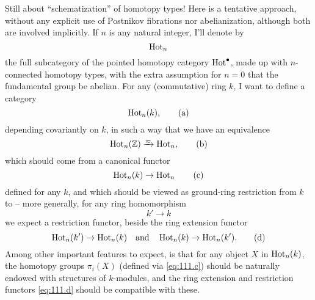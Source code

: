 \label{sec:111}%
Still about ``schematization'' of homotopy types! Here is a tentative
approach, without any explicit use of Postnikov fibrations nor
abelianization, although both are involved implicitly. If $n$ is any
natural integer, I'll denote by
\[\operatorname{Hot}_n\]
the full subcategory of the pointed homotopy category
$\operatorname{Hot}^\bullet$, made up with $n$-connected homotopy types, with the
extra assumption for $n=0$ that the fundamental group be abelian. For
any (commutative) ring $k$, I want to define a category
\begin{equation}
  \label{eq:111.a}
  \operatorname{Hot}_n(k),\tag{a}
\end{equation}
depending covariantly on $k$, in such a way that we have an
equivalence
\begin{equation}
  \label{eq:111.b}
  \HotOf_n(\bZ)\toequ\HotOf_n,\tag{b}
\end{equation}
which should come from a canonical functor
\begin{equation}
  \label{eq:111.c}
  \operatorname{Hot}_n(k) \to \operatorname{Hot}_n\tag{c}
\end{equation}
defined for any $k$, and which should be viewed as ground-ring
restriction from $k$ to \bZ{} -- more generally, for any ring
homomorphism
\[k'\to k\]
we expect a restriction functor, beside the ring extension functor
\begin{equation}
  \label{eq:111.d}
  \operatorname{Hot}_n(k')\to\operatorname{Hot}_n(k)\quad\text{and}\quad
  \operatorname{Hot}_n(k)\to\operatorname{Hot}_n(k').\tag{d}
\end{equation}
Among other important features to expect, is that for any object $X$
in $\operatorname{Hot}_n(k)$, the homotopy groups $\pi_i(X)$ (defined via
\eqref{eq:111.c}) should be naturally endowed with structures of
$k$-modules, and the ring extension and restriction functors
\eqref{eq:111.d} should be compatible with these.

